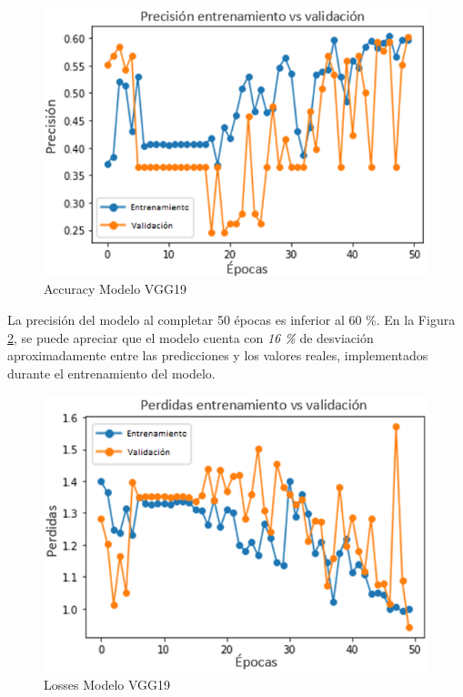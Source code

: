 \begin{figure}[ht]
	\centering
	\includegraphics[scale=0.5]{Figs/101.png}
	\caption{Accuracy Modelo VGG19}
	\label{fig:VGG19_accuracy}
\end{figure}  

La precisión del modelo al completar 50 épocas es inferior al 60 \%.	En la Figura \ref{fig:VGG19_losses}, se puede apreciar que el modelo cuenta con \textit{16 \%} de desviación aproximadamente entre las predicciones y los valores reales, implementados durante el entrenamiento del modelo.

\begin{figure}[ht]
	\centering
	\includegraphics[scale=0.55]{Figs/102.png}
	\caption{Losses Modelo VGG19}
	\label{fig:VGG19_losses}
\end{figure}

